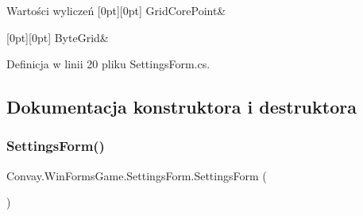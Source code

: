 \begin{DoxyEnumFields}{Wartości wyliczeń}
[0pt][0pt]{}\hypertarget{class_convay_1_1_win_forms_game_1_1_settings_form_a4226b510bf8cf0a0f4fc5bc2e9c334a6aa977546c97dda57fca9e9290f7c0eef0}{}\label{class_convay_1_1_win_forms_game_1_1_settings_form_a4226b510bf8cf0a0f4fc5bc2e9c334a6aa977546c97dda57fca9e9290f7c0eef0} 
Grid\+Core\+Point&\\
\hline

[0pt][0pt]{}\hypertarget{class_convay_1_1_win_forms_game_1_1_settings_form_a4226b510bf8cf0a0f4fc5bc2e9c334a6ae57f2cefbe31c647402a66ff65f2d5b9}{}\label{class_convay_1_1_win_forms_game_1_1_settings_form_a4226b510bf8cf0a0f4fc5bc2e9c334a6ae57f2cefbe31c647402a66ff65f2d5b9} 
Byte\+Grid&\\
\hline

\end{DoxyEnumFields}


Definicja w linii 20 pliku Settings\+Form.\+cs.



\subsection{Dokumentacja konstruktora i destruktora}
\hypertarget{class_convay_1_1_win_forms_game_1_1_settings_form_addc2d79faecc53f1287e88582bbfc376}{}\label{class_convay_1_1_win_forms_game_1_1_settings_form_addc2d79faecc53f1287e88582bbfc376} 
\subsubsection{\texorpdfstring{Settings\+Form()}{SettingsForm()}}
{\footnotesize\ttfamily Convay.\+Win\+Forms\+Game.\+Settings\+Form.\+Settings\+Form (\begin{DoxyParamCaption}{ }\end{DoxyParamCaption})}



